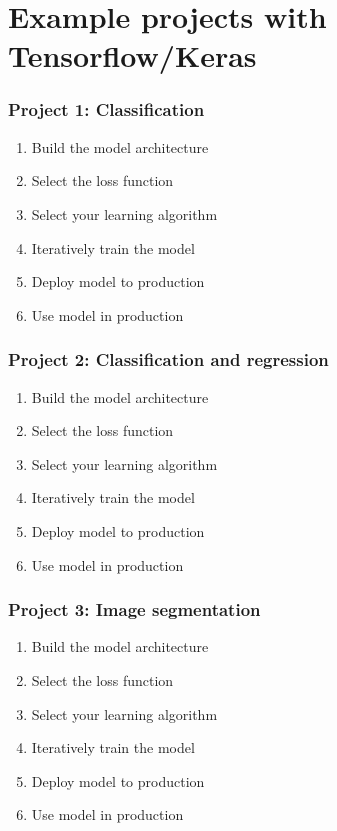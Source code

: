 \documentclass{beamer}
\def\light#1{{\color{light}#1}}
\begin{document}
\section{Example projects with Tensorflow/Keras}
\begin{frame}
\frametitle{Project 1: Classification}
\begin{example}
\begin{enumerate}
\item Build the model architecture 
\item Select the loss function
\item Select your learning algorithm
\item Iteratively train the model
\item \light{Deploy model to production}
\item \light{Use model in production}
\end{enumerate}
\end{example}
\end{frame}

\begin{frame}
\frametitle{Project 2: Classification and regression}
\begin{example}
\begin{enumerate}
\item Build the model architecture 
\item Select the loss function
\item Select your learning algorithm
\item Iteratively train the model
\item \light{Deploy model to production}
\item \light{Use model in production}
\end{enumerate}
\end{example}
\end{frame}


\begin{frame}
\frametitle{Project 3: Image segmentation}
\begin{example}
\begin{enumerate}
\item Build the model architecture 
\item Select the loss function
\item Select your learning algorithm
\item Iteratively train the model
\item \light{Deploy model to production}
\item \light{Use model in production}
\end{enumerate}
\end{example}
\end{frame}
\end{document}
